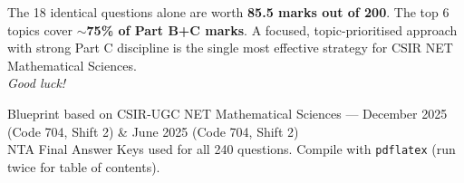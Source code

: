 \documentclass[12pt,a4paper]{article}
\begin{document}
\vspace{10pt}

\begin{alertgreen}
\small
The 18 identical questions alone are worth \textbf{85.5 marks out of 200}. The top 6 topics cover \textbf{$\sim$75\% of Part B+C marks}. A focused, topic-prioritised approach with strong Part C discipline is the single most effective strategy for CSIR NET Mathematical Sciences.\\[4pt]
\textit{Good luck!}
\end{alertgreen}

\vspace*{\fill}
\begin{center}
\small\color{grayprimary}
Blueprint based on CSIR-UGC NET Mathematical Sciences --- December 2025 (Code 704, Shift 2) \& June 2025 (Code 704, Shift 2)\\
NTA Final Answer Keys used for all 240 questions. Compile with \texttt{pdflatex} (run twice for table of contents).
\end{center}
\end{document}
